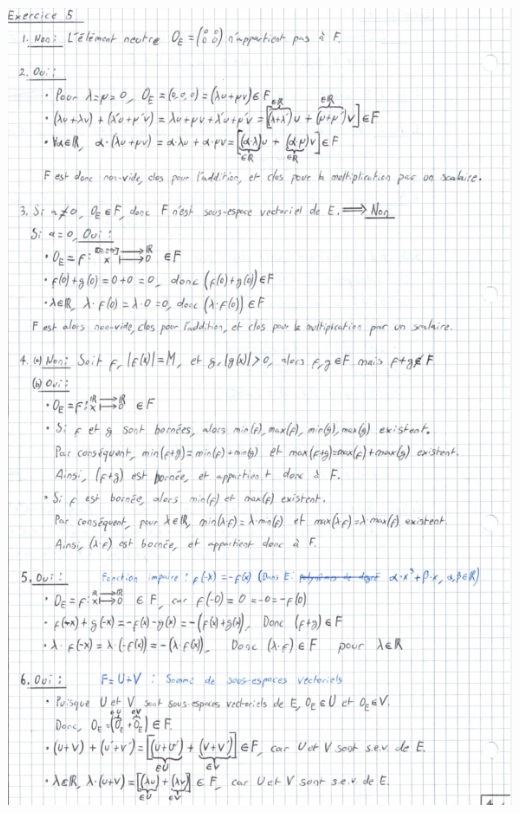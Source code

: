 \documentclass[a4paper, 10pt]{report}
\begin{document}
	\includegraphics{ex05.png}
	
\end{document}
